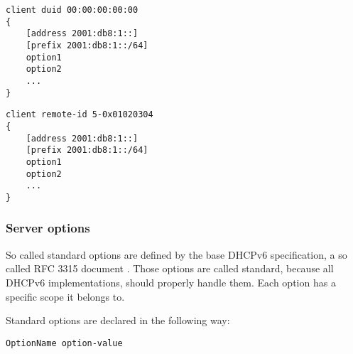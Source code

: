 \begin{lstlisting}
client duid 00:00:00:00:00
{
    [address 2001:db8:1::]
    [prefix 2001:db8:1::/64]
    option1
    option2
    ...
}
\end{lstlisting}

\begin{lstlisting}
client remote-id 5-0x01020304
{
    [address 2001:db8:1::]
    [prefix 2001:db8:1::/64]
    option1
    option2
    ...
}
\end{lstlisting}

\subsubsection{Server options}

So called standard options are defined by the base DHCPv6 specification,
a so called RFC 3315 document \cite{rfc3315}. Those options are
called standard, because all DHCPv6 implementations, should properly
handle them. Each option has a specific scope it belongs to.

Standard options are declared in the following way:

\begin{lstlisting}
OptionName option-value
\end{lstlisting}

